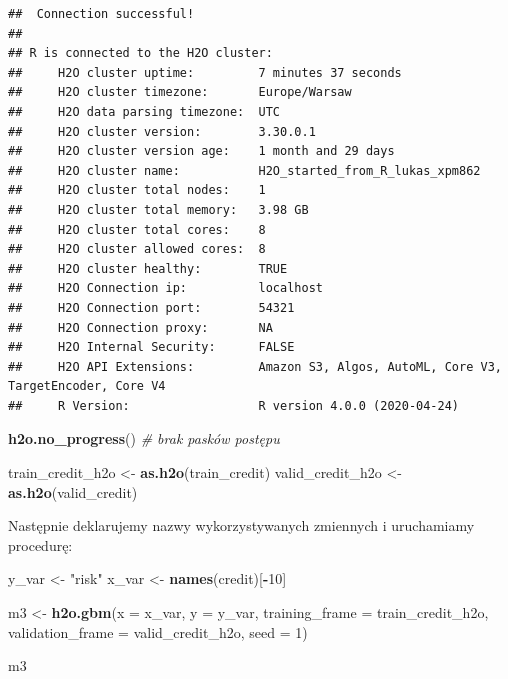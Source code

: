\documentclass[
]{book}
\newenvironment{Shaded}{\begin{snugshade}}{\end{snugshade}}
\newcommand{\CommentTok}[1]{\textcolor[rgb]{0.56,0.35,0.01}{\textit{#1}}}
\newcommand{\DataTypeTok}[1]{\textcolor[rgb]{0.13,0.29,0.53}{#1}}
\newcommand{\DecValTok}[1]{\textcolor[rgb]{0.00,0.00,0.81}{#1}}
\newcommand{\KeywordTok}[1]{\textcolor[rgb]{0.13,0.29,0.53}{\textbf{#1}}}
\newcommand{\NormalTok}[1]{#1}
\newcommand{\OperatorTok}[1]{\textcolor[rgb]{0.81,0.36,0.00}{\textbf{#1}}}
\newcommand{\StringTok}[1]{\textcolor[rgb]{0.31,0.60,0.02}{#1}}
\begin{document}
\begin{verbatim}
##  Connection successful!
## 
## R is connected to the H2O cluster: 
##     H2O cluster uptime:         7 minutes 37 seconds 
##     H2O cluster timezone:       Europe/Warsaw 
##     H2O data parsing timezone:  UTC 
##     H2O cluster version:        3.30.0.1 
##     H2O cluster version age:    1 month and 29 days  
##     H2O cluster name:           H2O_started_from_R_lukas_xpm862 
##     H2O cluster total nodes:    1 
##     H2O cluster total memory:   3.98 GB 
##     H2O cluster total cores:    8 
##     H2O cluster allowed cores:  8 
##     H2O cluster healthy:        TRUE 
##     H2O Connection ip:          localhost 
##     H2O Connection port:        54321 
##     H2O Connection proxy:       NA 
##     H2O Internal Security:      FALSE 
##     H2O API Extensions:         Amazon S3, Algos, AutoML, Core V3, TargetEncoder, Core V4 
##     R Version:                  R version 4.0.0 (2020-04-24)
\end{verbatim}

\begin{Shaded}
\begin{Highlighting}[]
\KeywordTok{h2o.no_progress}\NormalTok{() }\CommentTok{# brak pasków postępu}

\NormalTok{train_credit_h2o <-}\StringTok{ }\KeywordTok{as.h2o}\NormalTok{(train_credit)}
\NormalTok{valid_credit_h2o <-}\StringTok{ }\KeywordTok{as.h2o}\NormalTok{(valid_credit)}
\end{Highlighting}
\end{Shaded}

Następnie deklarujemy nazwy wykorzystywanych zmiennych i uruchamiamy procedurę:

\begin{Shaded}
\begin{Highlighting}[]
\NormalTok{y_var <-}\StringTok{ "risk"}
\NormalTok{x_var <-}\StringTok{ }\KeywordTok{names}\NormalTok{(credit)[}\OperatorTok{-}\DecValTok{10}\NormalTok{]}

\NormalTok{m3 <-}\StringTok{ }\KeywordTok{h2o.gbm}\NormalTok{(}\DataTypeTok{x =}\NormalTok{ x_var, }
              \DataTypeTok{y =}\NormalTok{ y_var, }
              \DataTypeTok{training_frame =}\NormalTok{ train_credit_h2o, }
              \DataTypeTok{validation_frame =}\NormalTok{ valid_credit_h2o, }
              \DataTypeTok{seed =} \DecValTok{1}\NormalTok{)}

\NormalTok{m3}
\end{Highlighting}
\end{Shaded}
\end{document}
